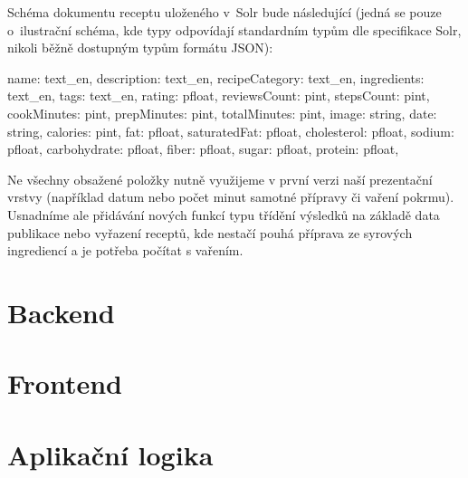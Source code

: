 Schéma dokumentu receptu uloženého v~Solr bude následující (jedná se pouze o~ilustrační schéma, kde typy odpovídají standardním typům dle specifikace Solr, nikoli běžně dostupným typům formátu JSON):

\begin{code}
{
    name: text_en,
    description: text_en,
    recipeCategory: text_en,
    ingredients: text_en,
    tags: text_en,
    rating: pfloat,
    reviewsCount: pint,
    stepsCount: pint,
    cookMinutes: pint,
    prepMinutes: pint,
    totalMinutes: pint,
    image: string,
    date: string,
    calories: pint,
    fat: pfloat,
    saturatedFat: pfloat,
    cholesterol: pfloat,
    sodium: pfloat,
    carbohydrate: pfloat,
    fiber: pfloat,
    sugar: pfloat,
    protein: pfloat,
}
\end{code}

Ne všechny obsažené položky nutně využijeme v první verzi naší prezentační vrstvy (například datum nebo počet minut samotné přípravy či vaření pokrmu). Usnadníme ale přidávání nových funkcí typu třídění výsledků na základě data publikace nebo vyřazení receptů, kde nestačí pouhá příprava ze syrových ingrediencí a je potřeba počítat s vařením.

\section{Backend}



\section{Frontend}


\section{Aplikační logika}